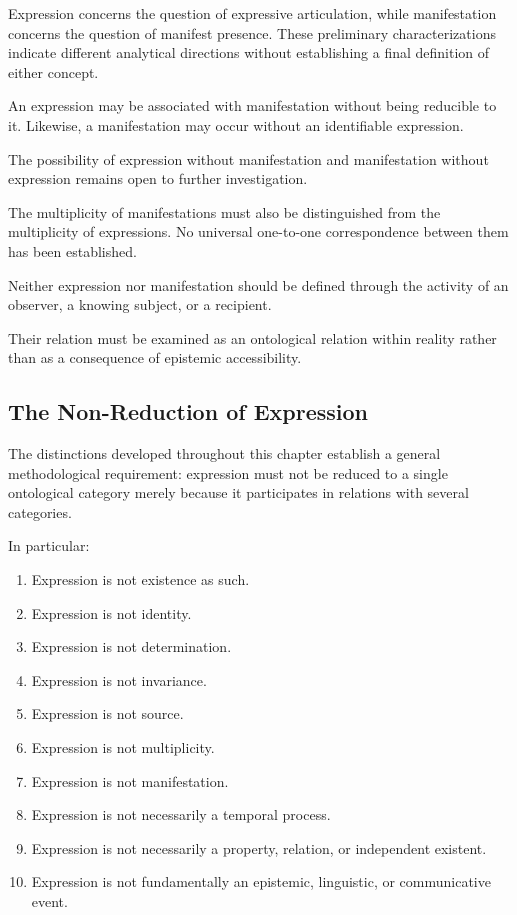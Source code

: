 Expression concerns the question of expressive
articulation, while manifestation concerns the
question of manifest presence. These preliminary
characterizations indicate different analytical
directions without establishing a final definition
of either concept.

An expression may be associated with manifestation
without being reducible to it. Likewise, a manifestation
may occur without an identifiable expression.

The possibility of expression without manifestation
and manifestation without expression remains open
to further investigation.

The multiplicity of manifestations must also be
distinguished from the multiplicity of expressions.
No universal one-to-one correspondence between
them has been established.

Neither expression nor manifestation should be
defined through the activity of an observer, a
knowing subject, or a recipient.

Their relation must be examined as an ontological
relation within reality rather than as a consequence
of epistemic accessibility.

\subsection{The Non-Reduction of Expression}

The distinctions developed throughout this chapter
establish a general methodological requirement:
expression must not be reduced to a single ontological
category merely because it participates in relations
with several categories.

In particular:

\begin{enumerate}
    \item Expression is not existence as such.

    \item Expression is not identity.

    \item Expression is not determination.

    \item Expression is not invariance.

    \item Expression is not source.

    \item Expression is not multiplicity.

    \item Expression is not manifestation.

    \item Expression is not necessarily a temporal process.

    \item Expression is not necessarily a property,
    relation, or independent existent.

    \item Expression is not fundamentally an epistemic,
    linguistic, or communicative event.
\end{enumerate}

